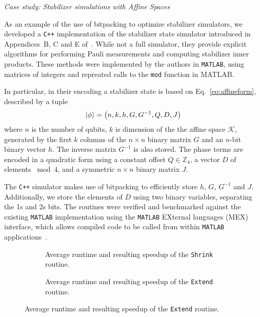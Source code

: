 \large{\itshape{Case study: Stabilizer simulations with Affine Spaces}}\par
As an example of the use of bitpacking to optimize stabilizer simulators, we developed a \texttt{C++} implementation of the stabilizer state simulator introduced in Appendices~B, C and E of~\cite{Bravyi2016}. While not a full simulator, they provide explicit algorithms for performing Pauli measurements and computing stabilizer inner products. These methods were implemented by the authors in \texttt{MATLAB}, using matrices of integers and repreated calls to the \texttt{mod} function in MATLAB.\par
In particular, in their encoding a stabilizer state is based on Eq.~\ref{eq:affineform}, described by a tuple
\[\ket{\phi} = \left(n, k, h, G, G^{-1}, Q, D, J\right)\]
where $n$ is the number of qubits, $k$ is dimension of the the affine space $\mathcal{K}$, generated by the first $k$ columns of the $n\times n$ binary matrix $G$ and an $n$-bit binary vector $h$. The inverse matrix $G^{-1}$ is also stored. The phase terms are encoded in a quadratic form using a constant offset $Q\in\mathbb{Z}_{4}$, a vector $D$ of elements $\bmod{4}$, and a symmetric $n\times n$ binary matrix $J$.\par
The \texttt{C++} simulator makes use of bitpacking to efficiently store $h$, $G$, $G^{-1}$ and $J$. Additionally, we store the elements of $D$ using two binary variables, separating the 1s and 2s bits. The routines were verified and benchmarked against the existing \texttt{MATLAB} implementation using the \texttt{MATLAB} EXternal languages (MEX) interface, which allows compiled code to be called from within \texttt{MATLAB} applications~\cite{MEXRef}.\par
\begin{figure}[p]
\centering
\caption{Figures showing the perforamnce of the \texttt{MATLAB} and \texttt{C++} implementations of a stabilize simulator based on Affine Spaces.}
\label{fig:affine_timings}
\begin{subfigure}[t]{0.9\textwidth}
    \begin{scaletikzpicturetowidth}{\textwidth}
        
    \end{scaletikzpicturetowidth}
    \caption{Average runtime and resulting speedup of the \texttt{Shrink} routine.}
\end{subfigure}
\begin{subfigure}[t]{0.9\textwidth}
    \caption{Average runtime and resulting speedup of the \texttt{Extend} routine.}
    \begin{scaletikzpicturetowidth}{\textwidth}
        
    \end{scaletikzpicturetowidth}
\end{subfigure}
\end{figure}
